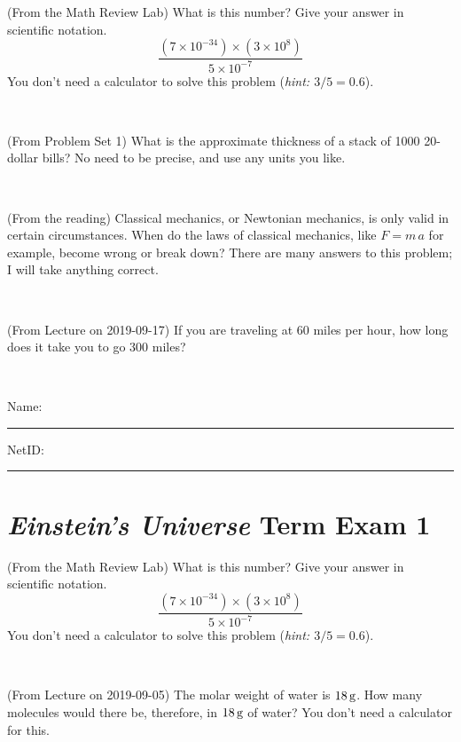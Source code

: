 \documentclass[12pt, letterpaper]{article}
\begin{document}
\begin{problem} (From the Math Review Lab)
What is this number? Give your answer in scientific notation.
$$
\frac{(7\times10^{-34})\times(3\times10^8)}{5\times10^{-7}}
$$
You don't need a calculator to solve this problem (\textit{hint: $3/5=0.6$}).
\end{problem}


\vfill ~

\begin{problem} (From Problem Set 1)
What is the approximate thickness of a stack of 1000 20-dollar bills?
No need to be precise, and use any units you like.
\end{problem}


\vfill ~

\begin{problem} (From the reading)
Classical mechanics, or Newtonian mechanics, is only valid in certain
circumstances. When do the laws of classical mechanics, like $F =
m\,a$ for example, become wrong or break down? There are many answers
to this problem; I will take anything correct.
\end{problem}


\vfill ~

\begin{problem} (From Lecture on 2019-09-17)
If you are traveling at 60 miles per hour, how long does
it take you to go 300 miles?
\end{problem}


\vfill ~


\cleardoublepage



\noindent
Name: \rule[-1ex]{0.60\textwidth}{0.1pt}
NetID: \rule[-1ex]{0.20\textwidth}{0.1pt}

\section*{\textsl{Einstein's Universe} Term Exam 1}
\setcounter{problem}{1}


\begin{problem} (From the Math Review Lab)
What is this number? Give your answer in scientific notation.
$$
\frac{(7\times10^{-34})\times(3\times10^8)}{5\times10^{-7}}
$$
You don't need a calculator to solve this problem (\textit{hint: $3/5=0.6$}).
\end{problem}


\vfill ~

\begin{problem} (From Lecture on 2019-09-05)
The molar weight of water is $18\,\mathrm{g}$. How many molecules would there
be, therefore, in $18\,\mathrm{g}$ of water? You don't need a calculator for
this.
\end{problem}
\end{document}
